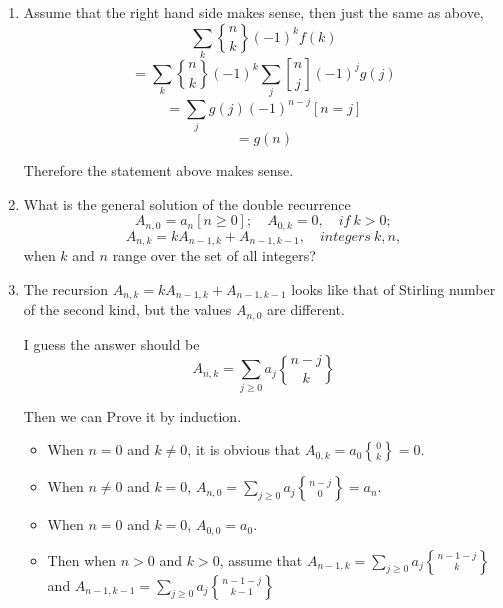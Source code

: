 \documentclass[12pt,a4paper]{article}
\makeatletter
\newtheorem*{solution}{Solution}
\theoremstyle{definition}
\renewenvironment{solution}[1][Solution] {\par\pushQED{\qed}\normalfont\topsep6\p@\@plus6\p@\relax\trivlist\item[\hskip\labelsep\bfseries#1\@addpunct{.}]\ignorespaces}{\popQED\endtrivlist\@endpefalse} \makeatother
\makeatother
\begin{document}
\begin{enumerate}
\begin{solution}
        	Assume that the right hand side makes sense, then just the same as above,
        	\begin{equation*}
        	    \sum_k{n \brace k}(-1)^kf(k)
        	\end{equation*}
        	\begin{equation*}
        	    =\sum_k{n \brace k}(-1)^k \sum_j {n \brack j}(-1)^j g(j)
        	\end{equation*}
        	\begin{equation*}
        	    =\sum_j g(j)(-1)^{n-j}[n=j]
        	\end{equation*}
        	\begin{equation*}
        	    =g(n)
        	\end{equation*}
        	
        	Therefore the statement above makes sense.
        \end{solution}
        \item 
        What is the general solution of the double recurrence
        \begin{equation*}
            A_{n,0}=a_n[n \ge 0];\quad A_{0,k}=0,\quad if\ k>0;
        \end{equation*}
        \begin{equation*}
            A_{n,k}=kA_{n-1,k}+A_{n-1,k-1},\quad integers\ k,n,
        \end{equation*}
        when $k$ and $n$ range over the set of all integers?
        \begin{solution}
        	The recursion $A_{n,k}=kA_{n-1,k}+A_{n-1,k-1}$ looks like that of Stirling number of the second kind, but the values $A_{n,0}$ are different.
        	
        	I guess the answer should be
        	\begin{equation*}
        	    A_{n,k}=\sum_{j\ge 0} a_j {n-j \brace k}
        	\end{equation*}
        	
        	Then we can Prove it by induction.
        	
        	\begin{itemize}
        		\item
        		    When $n=0$ and $k\neq 0$, it is obvious that $A_{0,k}=a_0{0 \brace k}=0$.
        		\item 
        		    When $n\neq 0$ and $k=0$, $A_{n,0}=\sum_{j \ge 0}a_j{n-j \brace 0}=a_n$.
        		\item 
        		    When $n=0$ and $k=0$, $A_{0,0}=a_0$.
        		\item 
        		    Then when $n>0$ and $k>0$, assume that $A_{n-1,k}=\sum_{j\ge 0} a_j {n-1-j \brace k}$ and $A_{n-1,k-1} =\sum_{j\ge 0} a_j {n-1-j \brace k-1}$
        		    

\end{itemize}
\end{solution}
\end{enumerate}
\end{document}
